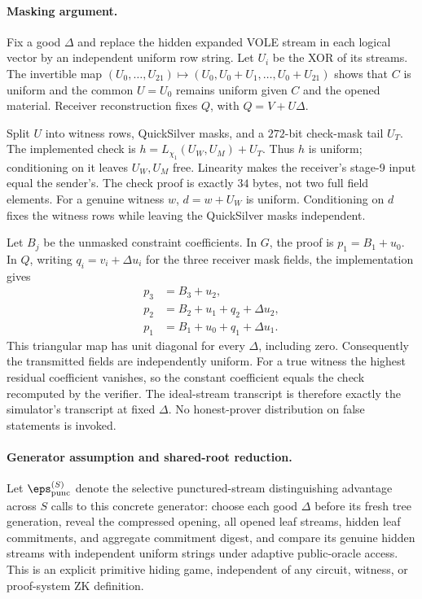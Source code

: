 \paragraph{Masking argument.}
Fix a good $\Delta$ and replace the hidden expanded VOLE stream in each
logical vector by an independent uniform row string.  Let $U_i$ be the XOR
of its streams.  The invertible map
$(U_0,\ldots,U_{21})\mapsto(U_0,U_0+U_1,\ldots,U_0+U_{21})$ shows that
$C$ is uniform and the common $U=U_0$ remains uniform given $C$ and the
opened material.  Receiver reconstruction fixes $Q$, with $Q=V+U\Delta$.

Split $U$ into witness rows, QuickSilver masks, and a $272$-bit check-mask
tail $U_T$.  The implemented check is
$h=L_{\chi_1}(U_W,U_M)+U_T$.  Thus $h$ is uniform; conditioning on it leaves
$U_W,U_M$ free.  Linearity makes the receiver's stage-9 input equal the
sender's.  The check proof is exactly $34$ bytes, not two full field elements.
For a genuine witness $w$, $d=w+U_W$ is uniform.  Conditioning on $d$ fixes
the witness rows while leaving the QuickSilver masks independent.

Let $B_j$ be the unmasked constraint coefficients.  In $G$, the proof is
$p_1=B_1+u_0$.  In $Q$, writing $q_i=v_i+\Delta u_i$ for the three receiver
mask fields, the implementation gives
\[
 \begin{aligned}
 p_3&=B_3+u_2,\\
 p_2&=B_2+u_1+q_2+\Delta u_2,\\
 p_1&=B_1+u_0+q_1+\Delta u_1.
 \end{aligned}
\]
This triangular map has unit diagonal for every $\Delta$, including zero.
Consequently the transmitted fields are independently uniform.  For a true
witness the highest residual coefficient vanishes, so the constant
coefficient equals the check recomputed by the verifier.  The ideal-stream
transcript is therefore exactly the simulator's transcript at fixed
$\Delta$.  No honest-prover distribution on false statements is invoked.

\paragraph{Generator assumption and shared-root reduction.}
Let $\eps_{\rm punc}^{(S)}$ denote the selective punctured-stream distinguishing
advantage across $S$ calls to this concrete generator: choose each good
$\Delta$ before its fresh tree
generation, reveal the compressed opening, all opened leaf streams, hidden leaf commitments, and aggregate commitment digest, and
compare its genuine hidden streams with independent uniform strings under
adaptive public-oracle access.  This is an explicit primitive hiding game,
independent of any circuit, witness, or proof-system ZK definition.

